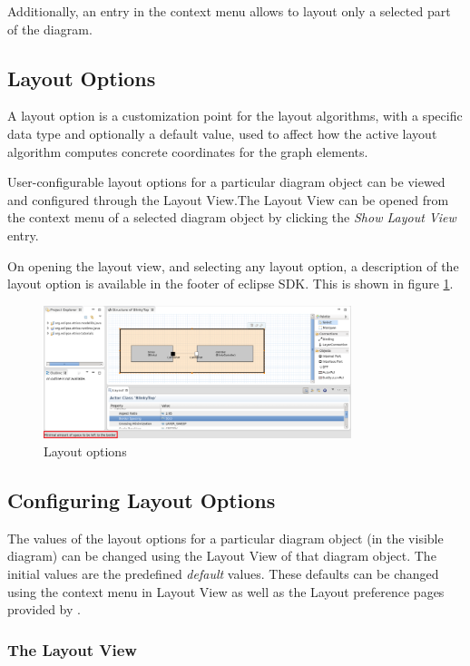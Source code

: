 Additionally, an entry in the context menu allows to layout only a selected part of the diagram.

\subsection{Layout Options}
\label{layoutOptions}

A layout option is a customization point for the layout algorithms, with a specific data type and 
optionally a default value, used to affect how the active layout algorithm computes concrete coordinates 
for the graph elements.

User-configurable layout options for a particular diagram object can be viewed and configured through the 
Layout View.The Layout View can be opened from the context menu of a selected diagram object by clicking 
the \textit{Show Layout View} entry. 

On opening the layout view, and selecting any layout option, a description of the layout option is 
available in the footer of eclipse SDK. This is shown in figure \ref{fig:layout_options}.

\begin{figure}
\includegraphics[width=0.8\textwidth]{images/043-LayoutOptionDescription.png}
\caption{Layout options}
\label{fig:layout_options}
\end{figure}

\subsection{Configuring Layout Options}
\label{configureOptions}

The values of the layout options for a particular diagram object (in the visible diagram) can be changed 
using the Layout View of that diagram object. The initial values are the predefined \emph{default} values. 
These defaults can be changed using the context menu in Layout View as well as the Layout preference pages 
provided by \eTrice{}.

\subsubsection{The Layout View}
\label{layoutView}

